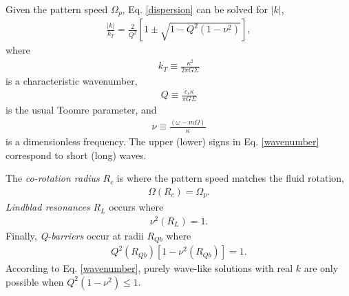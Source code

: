 Given the pattern speed $\Omega_p$,
Eq. \ref{dispersion} can be solved for $|k|$, 
\begin{align}\label{wavenumber}
  \frac{|k|}{k_T} = \frac{2}{Q^2}\left[1 \pm \sqrt{1 -
      Q^2(1-\nu^2)}\right], 
\end{align}
where 
\begin{align}
  k_T \equiv \frac{\kappa^2}{2\pi G \Sigma}
\end{align}
is a characteristic wavenumber, 
\begin{align}
  Q \equiv \frac{c_s\kappa}{\pi G \Sigma}
\end{align}
is the usual Toomre parameter, and
\begin{align}
  \nu \equiv \frac{(\omega - m\Omega)}{\kappa}
\end{align}
is a dimensionless frequency.  The upper (lower) signs in
Eq. \ref{wavenumber} correspond to short (long) waves.  

The \emph{co-rotation radius} $R_c$ is where the pattern speed matches
the fluid rotation,
\begin{align}
  \Omega(R_c) = \Omega_p.
\end{align}
\emph{Lindblad resonances} $R_L$ occurs where
\begin{align}
  \nu^2(R_L) = 1. 
\end{align}
Finally, \emph{Q-barriers} occur at radii $R_{Qb}$ where
\begin{align}
  Q^2(R_{Qb})\left[1-\nu^2(R_{Qb})\right] = 1.  
\end{align}
According to Eq. \ref{wavenumber}, purely wave-like solutions with
real $k$ are only possible when $Q^2(1-\nu^2)\leq1$.  




